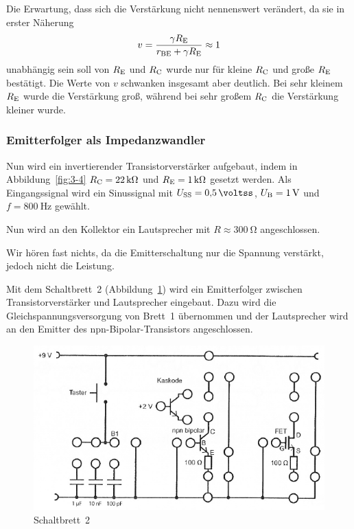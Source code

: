 Die Erwartung, dass sich die Verstärkung nicht nennenswert verändert, da sie in
erster Näherung 
\[
    v = \frac{\gamma\RE}{r_\text{BE}+\gamma\RE} \approx 1
\]
unabhängig sein soll von $\RE$ und $\RC$ wurde nur für kleine $\RC$ und große
$\RE$ bestätigt. Die Werte von $v$ schwanken insgesamt aber deutlich. Bei sehr
kleinem $\RE$ wurde die Verstärkung groß, während bei sehr großem $\RC$ die
Verstärkung kleiner wurde.

\subsubsection{Emitterfolger als Impedanzwandler}

Nun wird ein invertierender Transistorverstärker aufgebaut, indem in
Abbildung~\ref{fig:3-4} $\RC = \SI{22}{\kilo\ohm}$ und $\RE = \SI1{\kilo\ohm}$
gesetzt werden. Als Eingangssignal wird ein Sinussignal mit $U_\text{SS} = \SI
{0.5}{\voltss}$, $\UB = \SI1{\volt}$ und $f = \SI{800}{\hertz}$ gewählt.

Nun wird an den Kollektor ein Lautsprecher mit $R \approx \SI{300}{\ohm}$
angeschlossen. 

Wir hören fast nichts, da die Emitterschaltung nur die Spannung verstärkt,
jedoch nicht die Leistung.

Mit dem Schaltbrett~2 (Abbildung~\ref{fig:3-5}) wird ein Emitterfolger zwischen
Transistorverstärker und Lautsprecher eingebaut. Dazu wird die
Gleichspannungsversorgung von Brett~1 übernommen und der Lautsprecher wird an
den Emitter des npn-Bipolar-Transistors angeschlossen.

\begin{figure}
    \centering
    \includegraphics[width=\textwidth]{Anleitung/3-5.png}
    \caption{%
        Schaltbrett~2 \cite[Abbildung~3.5]{physik313-Anleitung}
    }
    \label{fig:3-5}
\end{figure}

